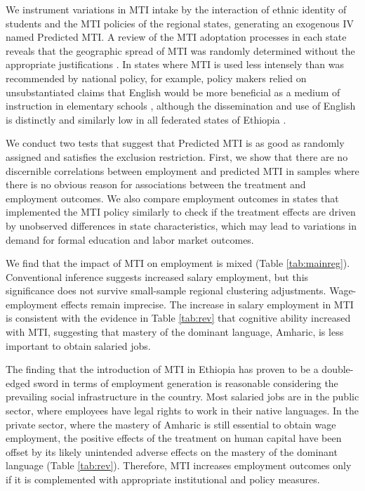 We instrument variations in MTI intake by the interaction of ethnic identity of students and the MTI policies of the regional states, generating an exogenous IV named Predicted MTI. A review of the MTI adoptation processes in each state reveals that the geographic spread of MTI was randomly determined without the appropriate justifications \citep{Heugh2007}. In states where MTI is used less intensely than was recommended by national policy, for example, policy makers relied on unsubstantiated claims that English would be more beneficial as a medium of instruction in elementary schools \citep{Heugh2007}, although the dissemination and use of English is distinctly and similarly low in all federated states of Ethiopia \citep{gerencheal2019foreign}. 

We conduct two tests that suggest that Predicted MTI is as good as randomly assigned and satisfies the exclusion restriction. First, we show that there are no discernible correlations between employment and predicted MTI in samples where there is no obvious reason for associations between the treatment and employment outcomes. We also compare employment outcomes in states that implemented the MTI policy similarly to check if the treatment effects are driven by unobserved differences in state characteristics, which may lead to variations in demand for formal education and labor market outcomes.

We find that the impact of MTI on employment is mixed (Table \ref{tab:mainreg}).  Conventional inference suggests increased salary employment, but this significance does not survive small-sample regional clustering adjustments. Wage-employment effects remain imprecise. The increase in salary employment in MTI is consistent with the evidence in Table \ref{tab:rev} that cognitive ability increased with MTI, suggesting that mastery of the dominant language, Amharic, is less important to obtain salaried jobs.

The finding that the introduction of MTI in Ethiopia has proven to be a double-edged sword in terms of employment generation is reasonable considering the prevailing social infrastructure in the country. Most salaried jobs are in the public sector, where employees have legal rights to work in their native languages. In the private sector, where the mastery of Amharic is still essential to obtain wage employment, the positive effects of the treatment on human capital have been offset by its likely unintended adverse effects on the mastery of the dominant language (Table \ref{tab:rev}). Therefore, MTI increases employment outcomes only if it is complemented with appropriate institutional and policy measures.


